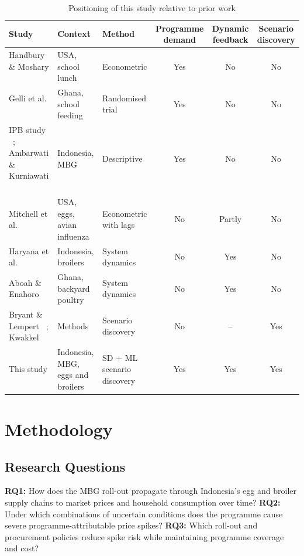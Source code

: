 \documentclass[10pt,twocolumn,a4paper]{article}
\begin{document}
\begin{table}[!t]
\centering
\scriptsize
\caption{Positioning of this study relative to prior work}\label{tab:gap}
\begin{tabularx}{\linewidth}{>{\raggedright\arraybackslash}X>{\raggedright\arraybackslash}p{3.2cm}>{\raggedright\arraybackslash}p{3cm}ccc}
\toprule
\textbf{Study} & \textbf{Context} & \textbf{Method} & \textbf{Programme demand} & \textbf{Dynamic feedback} & \textbf{Scenario discovery} \\
\midrule
Handbury \& Moshary ~\cite{handbury2021} & USA, school lunch & Econometric & Yes & No & No \\
Gelli et al. ~\cite{gelli2021} & Ghana, school feeding & Randomised trial & Yes & No & No \\
IPB study ~\cite{ipb2026}; Ambarwati \& Kurniawati ~\cite{ambarwati2025} & Indonesia, MBG & Descriptive & Yes & No & No \\
Mitchell et al. ~\cite{mitchell2024} & USA, eggs, avian influenza & Econometric with lags & No & Partly & No \\
Haryana et al. ~\cite{haryana2026} & Indonesia, broilers & System dynamics & No & Yes & No \\
Aboah \& Enahoro ~\cite{aboah2022} & Ghana, backyard poultry & System dynamics & No & Yes & No \\
Bryant \& Lempert ~\cite{bryant2010}; Kwakkel ~\cite{kwakkel2017} & Methods & Scenario discovery & No & -- & Yes \\
This study & Indonesia, MBG, eggs and broilers & SD + ML scenario discovery & Yes & Yes & Yes \\
\bottomrule
\end{tabularx}
\end{table}

\section{Methodology}\label{sec:method}

\subsection{Research Questions}

\noindent\textbf{RQ1:} How does the MBG roll-out propagate through Indonesia's egg and broiler supply chains to market prices and household consumption over time? \textbf{RQ2:} Under which combinations of uncertain conditions does the programme cause severe programme-attributable price spikes? \textbf{RQ3:} Which roll-out and procurement policies reduce spike risk while maintaining programme coverage and cost?
\end{document}
